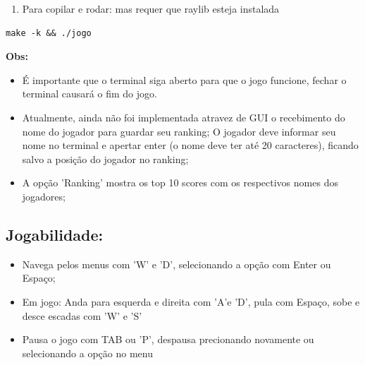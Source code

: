 \documentclass[11pt]{article}
\begin{document}
\begin{enumerate}
\item Para copilar e rodar:
mas requer que raylib esteja instalada
\end{enumerate}
\begin{verbatim}
make -k && ./jogo
\end{verbatim}

\textbf{Obs:}
\begin{itemize}
\item É importante que o terminal siga aberto para que o jogo funcione, fechar o terminal causará o fim do jogo.
\item Atualmente, ainda não foi implementada atravez de GUI o recebimento do nome do jogador para guardar seu ranking;
O jogador deve informar seu nome no terminal e apertar enter (o nome deve ter até 20 caracteres), ficando salvo a posição do jogador no ranking;
\item A opção 'Ranking' mostra os top 10 scores com os respectivos nomes dos jogadores;
\end{itemize}
\subsection{Jogabilidade:}
\label{sec:orgf156817}
\begin{itemize}
\item Navega pelos menus com 'W' e 'D', selecionando a opção com Enter ou Espaço;
\item Em jogo: Anda para esquerda e direita com 'A'e 'D', pula com Espaço, sobe e desce escadas com 'W' e 'S'
\item Pausa o jogo com TAB ou 'P', despausa precionando novamente ou selecionando a opção no menu
\end{itemize}
\end{document}
